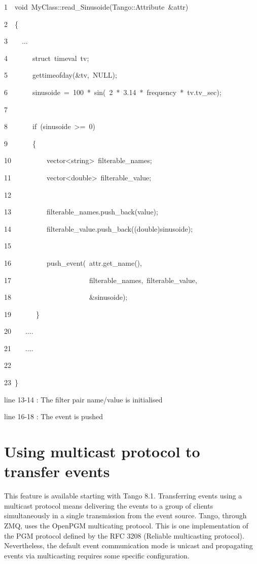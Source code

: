 
\begin{lyxcode}
1~~void~MyClass::read\_Sinusoide(Tango::Attribute~\&attr)

2~~\{

3~~~~...

4~~~~~~~struct~timeval~tv;

5~~~~~~~gettimeofday(\&tv,~NULL);

6~~~~~~~sinusoide~=~100~{*}~sin(~2~{*}~3.14~{*}~frequency~{*}~tv.tv\_sec);

7~~

8~~~~~~~if~(sinusoide~>=~0)~

9~~~~~~~\{

10~~~~~~~~~~vector<string>~filterable\_names;

11~~~~~~~~~~vector<double>~filterable\_value;

12~

13~~~~~~~~~~filterable\_names.push\_back(\textquotedbl{}value\textquotedbl{});

14~~~~~~~~~~filterable\_value.push\_back((double)sinusoide);

15~

16~~~~~~~~~~push\_event(~attr.get\_name(),

17~~~~~~~~~~~~~~~~~~~~~~filterable\_names,~filterable\_value,

18~~~~~~~~~~~~~~~~~~~~~~\&sinusoide);

19~~~~~~~\}

20~~~~....

21~~~~....

22~

23~\}
\end{lyxcode}


line 13-14 : The filter pair name/value is initialised

line 16-18 : The event is pushed


\section{Using multicast protocol to transfer events}

This feature is available starting with Tango 8.1. Transferring events
using a multicast protocol means delivering the
events to a group of clients simultaneously in a single transmission
from the event source. Tango, through ZMQ, uses the OpenPGM multicating
protocol. This is one implementation of the PGM protocol defined by
the RFC 3208 (Reliable multicasting protocol). Nevertheless, the default
event communication mode is unicast and propagating events via multicasting
requires some specific configuration.


